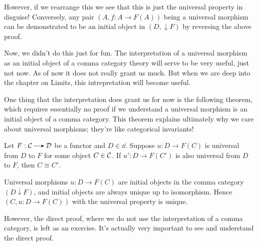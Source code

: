 \begin{prf}
\begin{center}
            \hspace{1cm}
        \end{center}
        However, if we rearrange this we see that this is just the universal property in disguise!
        Conversely, any pair $(A, f:  A \to F(A))$ being a universal morphism
        can be demonstrated to be an initial object in $(D, \downarrow F)$ by reversing the 
        above proof. 
    \end{prf}

    Now, we didn't do this just for fun. The interpretation of a universal morphism 
    as an initial object of a comma category theory will serve to be very useful, just not now. 
    As of now it does not really grant us much. But when we are deep into the chapter on Limits, 
    this intrepretation will become useful.

    One thing that the interpretation does grant us for now is the following theorem, 
    which requires essentially no proof if we understand a universal morphism is an initial object 
    of a comma category.
    This theorem explains ultimately why we care about universal morphisms; they're 
    like categorical invariants!

    \begin{theorem}\label{theorem:universal_elements_are_isomorphic}
        Let $F: \cc \to \dd$ be a functor and $D \in \dd$. 
        Suppose $u: D \to F(C)$ is universal from $D$ to $F$ 
        for some object $C \in \mathcal{C}$.
        If $u': D \to F(C')$ is also universal from $D$ to $F$, then 
        $C \cong C'$. 
    \end{theorem}

    \begin{prf}
        Universal morphisms $u: D \to F(C)$ are initial objects 
        in the comma category $(D \downarrow F)$, and initial objects are always unique up to isomorphism.
        Hence $(C, u:D \to F(C))$ with the universal property is unique.
    \end{prf}

    However, the direct proof, where we do not use the interpretation of a comma category, 
    is left as an exercise. It's actually very important to see and understand the direct proof. 
    
